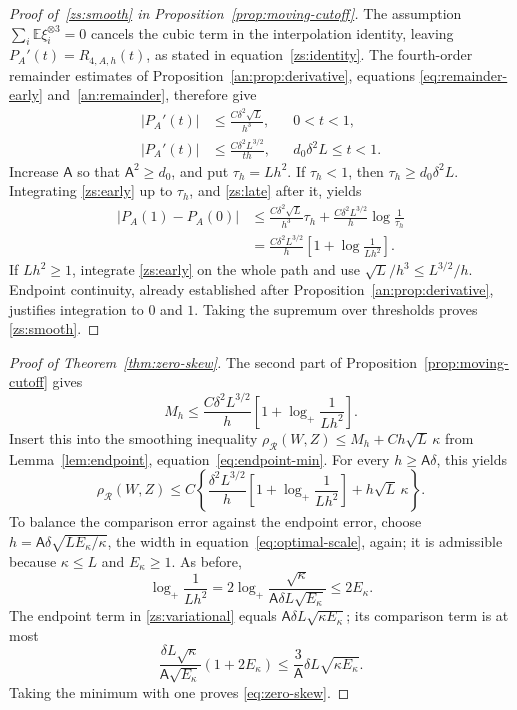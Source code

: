 \documentclass[11pt,letterpaper]{article}
\newcommand{\Ac}{\mathsf A}
\theoremstyle{remark}
\newcommand{\E}{\mathbb E}
\newcommand{\rh}{\rho_{\mathcal R}}
\begin{document}
\begin{proof}[Proof of~\eqref{zs:smooth} in
Proposition~\ref{prop:moving-cutoff}]
The assumption \(\sum_i\E\xi_i^{\otimes3}=0\) cancels the cubic
term in the interpolation identity, leaving
\(P_A'(t)=R_{4,A,h}(t)\), as stated in equation~\eqref{zs:identity}.
The fourth-order remainder estimates of
Proposition~\ref{an:prop:derivative}, equations
\eqref{eq:remainder-early} and~\eqref{an:remainder}, therefore give
\begin{align}
 |P_A'(t)|
 &\le \frac{C\delta^2\sqrt L}{h^3},
 &&0<t<1,\label{zs:early}\\
 |P_A'(t)|
 &\le \frac{C\delta^2L^{3/2}}{t h},
 &&d_0\delta^2L\le t<1.\label{zs:late}
\end{align}
Increase \(\Ac\) so that \(\Ac^2\ge d_0\), and put \(\tau_h=Lh^2\).
If \(\tau_h<1\), then \(\tau_h\ge d_0\delta^2L\). Integrating
\eqref{zs:early} up to \(\tau_h\), and \eqref{zs:late} after it,
yields
\begin{align*}
 |P_A(1)-P_A(0)|
 &\le \frac{C\delta^2\sqrt L}{h^3}\tau_h
       +\frac{C\delta^2L^{3/2}}h\log\frac1{\tau_h}\\
 &=\frac{C\delta^2L^{3/2}}h
       \left[1+\log\frac1{Lh^2}\right].
\end{align*}
If \(Lh^2\ge1\), integrate \eqref{zs:early} on the whole path and
use \(\sqrt L/h^3\le L^{3/2}/h\). Endpoint continuity, already
established after Proposition~\ref{an:prop:derivative}, justifies
integration to \(0\) and \(1\). Taking the supremum over thresholds
proves \eqref{zs:smooth}.
\end{proof}

\begin{proof}[Proof of Theorem~\ref{thm:zero-skew}]
The second part of Proposition~\ref{prop:moving-cutoff} gives
\[
 M_h\le\frac{C\delta^2L^{3/2}}h
       \left[1+\log_+\frac1{Lh^2}\right].
\]
Insert this into the smoothing inequality
\(\rh(W,Z)\le M_h+Ch\sqrt L\,\kappa\) from
Lemma~\ref{lem:endpoint}, equation~\eqref{eq:endpoint-min}.
For every \(h\ge\Ac\delta\), this yields
\begin{equation}
 \rh(W,Z)\le C\left\{
 \frac{\delta^2L^{3/2}}h
 \left[1+\log_+\frac1{Lh^2}\right]+h\sqrt L\,\kappa\right\}.
 \label{zs:variational}
\end{equation}
To balance the comparison error against the endpoint error, choose
\(h=\Ac\delta\sqrt{LE_\kappa/\kappa}\), the width in
equation~\eqref{eq:optimal-scale}, again; it is admissible because \(\kappa\le L\) and \(E_\kappa\ge1\).
As before,
\[
 \log_+\frac1{Lh^2}
 =2\log_+\frac{\sqrt\kappa}{\Ac\delta L\sqrt{E_\kappa}}
 \le2E_\kappa.
\]
The endpoint term in \eqref{zs:variational} equals
\(\Ac\delta L\sqrt{\kappa E_\kappa}\); its comparison term is at most
\[
 \frac{\delta L\sqrt\kappa}{\Ac\sqrt{E_\kappa}}(1+2E_\kappa)
 \le\frac3{\Ac}\delta L\sqrt{\kappa E_\kappa}.
\]
Taking the minimum with one proves \eqref{eq:zero-skew}.

\end{proof}
\end{document}
